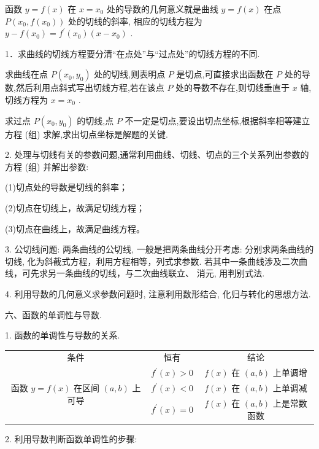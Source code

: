 函数 $y = f\left( x\right)$ 在 $x = {x}_{0}$ 处的导数的几何意义就是曲线 $y = f\left( x\right)$ 在点 $P\left( {{x}_{0},f\left( {x}_{0}\right) }\right)$ 处的切线的斜率, 相应的切线方程为 $y - f\left( {x}_{0}\right)  = {f}^{\prime }\left( {x}_{0}\right) \left( {x - {x}_{0}}\right)$ .

1．求曲线的切线方程要分清“在点处”与“过点处”的切线方程的不同.

求曲线在点 $P\left( {{x}_{0},{y}_{0}}\right)$ 处的切线,则表明点 $P$ 是切点,可直接求出函数在 $P$ 处的导数,然后利用点斜式写出切线方程,若在该点 $P$ 处的导数不存在,则切线垂直于 $x$ 轴,切线方程为 $x = {x}_{0}$ .

求过点 $P\left( {{x}_{0},{y}_{0}}\right)$ 的切线,点 $P$ 不一定是切点,要设出切点坐标,根据斜率相等建立方程 (组) 求解,求出切点坐标是解题的关键.

2. 处理与切线有关的参数问题,通常利用曲线、切线、切点的三个关系列出参数的方程 (组) 并解出参数:

(1)切点处的导数是切线的斜率；

(2)切点在切线上，故满足切线方程；

(3)切点在曲线上，故满足曲线方程。

3. 公切线问题: 两条曲线的公切线, 一般是把两条曲线分开考虑: 分别求两条曲线的切线, 化为斜截式方程，利用方程相等，列式求参数. 若其中一条曲线涉及二次曲线，可先求另一条曲线的切线，与二次曲线联立、 消元, 用判别式法.

4. 利用导数的几何意义求参数问题时, 注意利用数形结合, 化归与转化的思想方法.

六、函数的单调性与导数.

1. 函数的单调性与导数的关系.

\begin{center}
\begin{tabular}{|c|c|c|}
\hline
条件 & 恒有 & 结论 \\
\cline{1-3}
\multirow{3}{*}{函数 $y = f\left( x\right)$ 在区间 $\left( {a,b}\right)$ 上可导} & ${f}^{\prime }\left( x\right)  > 0$ & $f\left( x\right)$ 在 $\left( {a,b}\right)$ 上单调增 \\
\cline{2-3}
 & ${f}^{\prime }\left( x\right)  < 0$ & $f\left( x\right)$ 在 $\left( {a,b}\right)$ 上单调减 \\
\cline{2-3}
 & ${f}^{\prime }\left( x\right)  = 0$ & $f\left( x\right)$ 在 $\left( {a,b}\right)$ 上是常数函数 \\
\cline{1-3}
\hline
\end{tabular}
\end{center}

2. 利用导数判断函数单调性的步骤:

